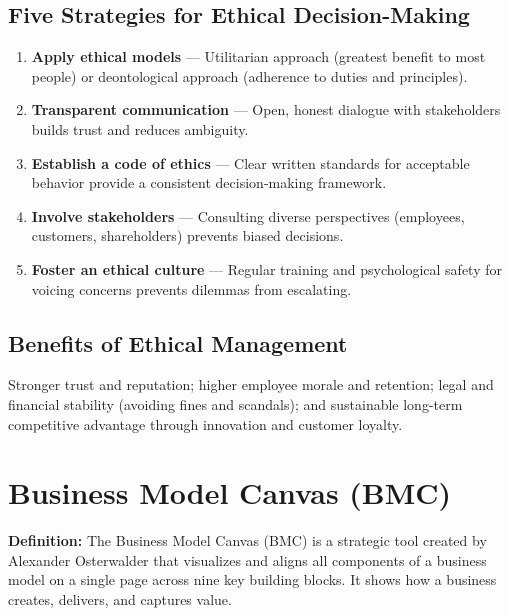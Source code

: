 \documentclass[11pt, letterpaper]{article}
\begin{document}
\subsection{Five Strategies for Ethical Decision-Making}

\begin{enumerate}[leftmargin=*, label=\textbf{\arabic*.}]
  \item \textbf{Apply ethical models} --- Utilitarian approach (greatest benefit to most people) or deontological approach (adherence to duties and principles).
  \item \textbf{Transparent communication} --- Open, honest dialogue with stakeholders builds trust and reduces ambiguity.
  \item \textbf{Establish a code of ethics} --- Clear written standards for acceptable behavior provide a consistent decision-making framework.
  \item \textbf{Involve stakeholders} --- Consulting diverse perspectives (employees, customers, shareholders) prevents biased decisions.
  \item \textbf{Foster an ethical culture} --- Regular training and psychological safety for voicing concerns prevents dilemmas from escalating.
\end{enumerate}

\subsection{Benefits of Ethical Management}

Stronger trust and reputation; higher employee morale and retention; legal and financial stability (avoiding fines and scandals); and sustainable long-term competitive advantage through innovation and customer loyalty.

\newpage

\section{Business Model Canvas (BMC)}

\begin{defbox}
\textbf{Definition:} The Business Model Canvas (BMC) is a strategic tool created by Alexander Osterwalder that visualizes and aligns all components of a business model on a single page across nine key building blocks. It shows how a business creates, delivers, and captures value.
\end{defbox}
\end{document}
